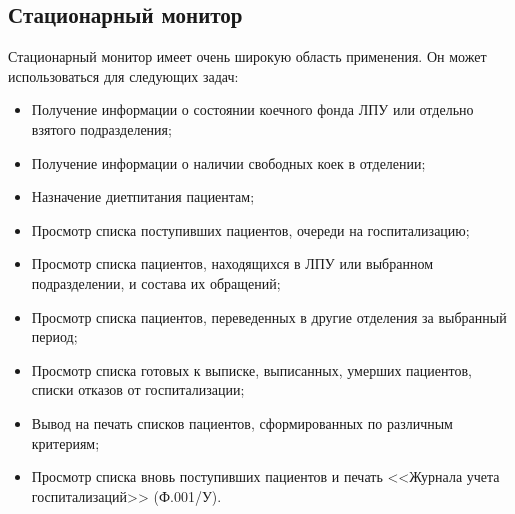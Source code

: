 
 

\subsection{Стационарный монитор} \label{st_mon}

Стационарный монитор имеет очень широкую область применения. Он может использоваться для следующих задач:
\begin{itemize}
 \item Получение информации о состоянии коечного фонда ЛПУ или отдельно взятого подразделения;
 \item Получение информации о наличии свободных коек в отделении;
 \item Назначение диетпитания пациентам;
 \item Просмотр списка поступивших пациентов, очереди на госпитализацию;
 \item Просмотр списка пациентов, находящихся в ЛПУ или выбранном подразделении, и состава их обращений; 
 \item Просмотр списка пациентов, переведенных в другие отделения за  выбранный период;
 \item Просмотр списка готовых к выписке, выписанных, умерших пациентов, списки отказов от госпитализации;
 \item Вывод на печать списков пациентов, сформированных по различным критериям;
 \item Просмотр списка вновь поступивших пациентов и печать <<Журнала учета госпитализаций>> (Ф.001/У).
\end{itemize}
 
